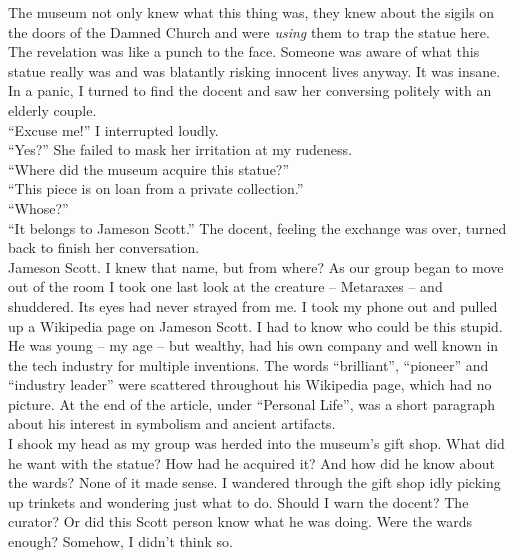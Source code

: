 \documentclass[a5paper]{scrartcl}
\begin{document}
The museum not only knew what this thing was, they knew about the sigils on the doors of the Damned Church and were \textit{using}
 them to trap the statue here. The revelation was like a punch to the face. Someone was aware of what this statue really was and was blatantly risking innocent lives anyway. It was insane.\\


In a panic, I turned to find the docent and saw her conversing politely with an elderly couple. \\


\enquote{Excuse me!} I interrupted loudly. \\


\enquote{Yes?} She failed to mask her irritation at my rudeness.\\


\enquote{Where did the museum acquire this statue?}\\


\enquote{This piece is on loan from a private collection.}\\


\enquote{Whose?}\\


\enquote{It belongs to Jameson Scott.} The docent, feeling the exchange was over, turned back to finish her conversation. \\


Jameson Scott. I knew that name, but from where? As our group began to move out of the room I took one last look at the creature -- Metaraxes -- and shuddered. Its eyes had never strayed from me. I took my phone out and pulled up a Wikipedia page on Jameson Scott. I had to know who could be this stupid.\\


He was young -- my age -- but wealthy, had his own company and well known in the tech industry for multiple inventions. The words \enquote{brilliant}, \enquote{pioneer} and \enquote{industry leader} were scattered throughout his Wikipedia page, which had no picture. At the end of the article, under \enquote{Personal Life}, was a short paragraph about his interest in symbolism and ancient artifacts.\\


I shook my head as my group was herded into the museum's gift shop. What did he want with the statue? How had he acquired it? And how did he know about the wards? None of it made sense. I wandered through the gift shop idly picking up trinkets and wondering just what to do. Should I warn the docent? The curator? Or did this Scott person know what he was doing.  Were the wards enough? Somehow, I didn't think so.\\
\end{document}
